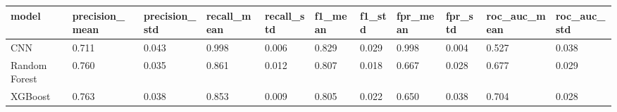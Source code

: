 \begin{tabular}{lllllllllll}
\toprule
model & precision_mean & precision_std & recall_mean & recall_std & f1_mean & f1_std & fpr_mean & fpr_std & roc_auc_mean & roc_auc_std \\
\midrule
CNN & 0.711 & 0.043 & 0.998 & 0.006 & 0.829 & 0.029 & 0.998 & 0.004 & 0.527 & 0.038 \\
Random Forest & 0.760 & 0.035 & 0.861 & 0.012 & 0.807 & 0.018 & 0.667 & 0.028 & 0.677 & 0.029 \\
XGBoost & 0.763 & 0.038 & 0.853 & 0.009 & 0.805 & 0.022 & 0.650 & 0.038 & 0.704 & 0.028 \\
\bottomrule
\end{tabular}
